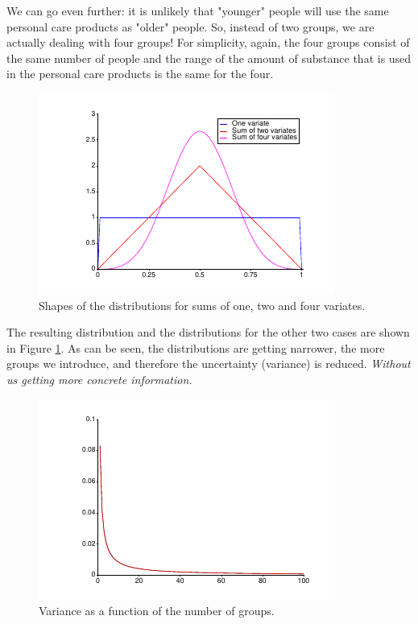 \documentclass[onecolumn]{article}
\begin{document}
We can go even further: it is unlikely that "younger" people will use the same
personal care products as "older" people. So, instead of two groups, we are actually
dealing with four groups! For simplicity, again, the four groups consist of the
same number of people and the range of the amount of substance that is used in the
personal care products is the same for the four.

\begin{figure}
\begin{center}
\includegraphics[width=.7\textwidth]{uniform_distros.pdf}
\caption{Shapes of the distributions for sums of one, two and four variates.}
\label{distrib}
\end{center}
\end{figure}

The resulting distribution and the distributions for the other two cases are
shown in Figure \ref{distrib}. As can be seen, the distributions are getting
narrower, the more groups we introduce, and therefore the uncertainty (variance) is
reduced. \emph{Without us getting more concrete information.}

\begin{figure}
\begin{center}
\includegraphics[width=.7\textwidth]{uniform_variance.pdf}
\caption{Variance as a function of the number of groups.}
\label{variance}
\end{center}
\end{figure}
\end{document}
